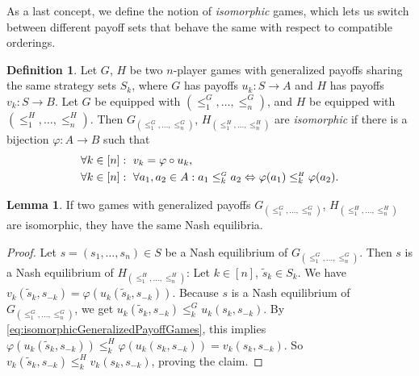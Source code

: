 \documentclass[a4paper]{scrreprt}
\let\phi\varphi
\theoremstyle{definition}
\newtheorem{lemma}[thm]{Lemma} %
\newtheorem{defn}[thm]{Definition} %
\begin{document}
    As a last concept, we define the notion of \emph{isomorphic} games, which lets us switch between different payoff sets that behave the same with respect to compatible orderings.
    \begin{defn}
        Let $G$, $H$ be two $n$-player games with generalized payoffs sharing the same strategy sets $S_k$, where $G$ has payoffs $u_k: S \to A$ and $H$ has payoffs $v_k: S \to B$.
        Let $G$ be equipped with $(\leq_1^{\scriptscriptstyle G}, \dots, \leq_n^{\scriptscriptstyle G})$, and $H$ be equipped with $(\leq_1^{\scriptscriptstyle H}, \dots, \leq_n^{\scriptscriptstyle H})$.
        Then $G_{(\leq_1^{\scriptscriptstyle G}, \dots, \leq_n^{\scriptscriptstyle G})}$, $H_{(\leq_1^{\scriptscriptstyle H}, \dots, \leq_n^{\scriptscriptstyle H})}$
        are \emph{isomorphic} if there is a bijection $\phi: A \to B$ such that
        \begin{align}
            &\forall k  \in [n]:~ v_k = \phi \circ u_k, \\
            &\forall k  \in [n]:~ \forall a_1, a_2 \in A: a_1 \leq_k^{\scriptscriptstyle G} a_2 \lra \phi(a_1) \leq_k^{\scriptscriptstyle H} \phi(a_2).
            \label{eq:isomorphicGeneralizedPayoffGames}
        \end{align}
    \end{defn}
    
    \begin{lemma}
        If two games with generalized payoffs $G_{(\leq_1^{\scriptscriptstyle G}, \dots, \leq_n^{\scriptscriptstyle G})}$, $H_{(\leq_1^{\scriptscriptstyle H}, \dots, \leq_n^{\scriptscriptstyle H})}$ are isomorphic,
        they have the same Nash equilibria.
    \end{lemma}
    \begin{proof}
        Let $s = (s_1, \dots, s_n) \in S$ be a Nash equilibrium of $G_{(\leq_1^{\scriptscriptstyle G}, \dots, \leq_n^{\scriptscriptstyle G})}$.
        Then $s$ is a Nash equilibrium of $H_{(\leq_1^{\scriptscriptstyle H}, \dots, \leq_n^{\scriptscriptstyle H})}$: Let $k \in [n]$, $\tilde{s}_k \in S_k$.
        We have $v_k(\tilde{s}_k, s_{-k}) = \phi(u_k(\tilde{s}_k, s_{-k}))$. Because $s$ is a Nash equilibrium of $G_{(\leq_1^{\scriptscriptstyle G}, \dots, \leq_n^{\scriptscriptstyle G})}$, we get $u_k(\tilde{s}_k, s_{-k}) \leq_k^{\scriptscriptstyle G} u_k(s_k, s_{-k})$.
        By \eqref{eq:isomorphicGeneralizedPayoffGames}, this implies $\phi(u_k(\tilde{s}_k, s_{-k})) \leq_k^{\scriptscriptstyle H} \phi(u_k(s_k, s_{-k})) = v_k(s_k, s_{-k})$.
        So $v_k(\tilde{s}_k, s_{-k}) \leq_k^{\scriptscriptstyle H} v_k(s_k, s_{-k})$, proving the claim.
    \end{proof}
    
\end{document}
